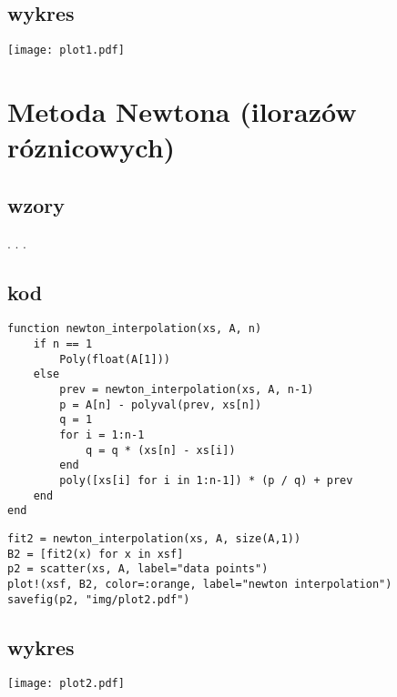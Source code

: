 \subsection{\bf wykres}
\begin{center}
    \texttt{[image: plot1.pdf]}
\end{center}
\clearpage
\section{\bf Metoda Newtona (ilorazów róznicowych)}

\subsection{\bf wzory}
    . . .

\subsection{\bf kod}
\begin{lstlisting}
function newton_interpolation(xs, A, n)
    if n == 1
        Poly(float(A[1]))
    else
        prev = newton_interpolation(xs, A, n-1)
        p = A[n] - polyval(prev, xs[n])
        q = 1
        for i = 1:n-1
            q = q * (xs[n] - xs[i])
        end        
        poly([xs[i] for i in 1:n-1]) * (p / q) + prev
    end
end
\end{lstlisting}
\begin{lstlisting}
fit2 = newton_interpolation(xs, A, size(A,1))
B2 = [fit2(x) for x in xsf]
p2 = scatter(xs, A, label="data points")
plot!(xsf, B2, color=:orange, label="newton interpolation")
savefig(p2, "img/plot2.pdf")
\end{lstlisting}

\subsection{\bf wykres}
\begin{center}
    \texttt{[image: plot2.pdf]}
\end{center}
\clearpage

\tableofcontents

